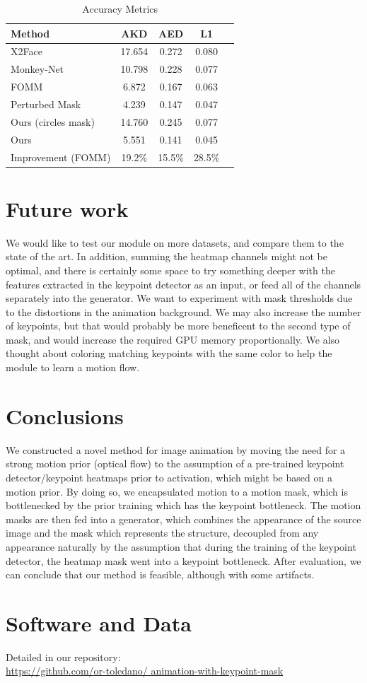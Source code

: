\documentclass{article}
\begin{document}
\begin{table}[t]
\caption{Accuracy Metrics}
\label{table:results}
\vskip 0.15in
\begin{center}
\begin{small}
\begin{sc}
\begin{tabular}{lcccr}
\toprule
Method & AKD & AED & L1 \\
\midrule
X2Face    & 17.654 & 0.272 & 0.080 \\
Monkey-Net    & 10.798 & 0.228 & 0.077 \\
FOMM    & 6.872 & 0.167 & 0.063 \\
Perturbed Mask & 4.239 & 0.147 & 0.047 \\
Ours (circles mask) & 14.760& 0.245 & 0.077 \\
Ours & 5.551 & 0.141 &  0.045\\
\midrule
Improvement (FOMM)    & 19.2\% & 15.5\% & 28.5\% \\
\bottomrule
\end{tabular}
\end{sc}
\end{small}
\end{center}
\vskip -0.1in
\end{table}
\section{Future work}
\label{future}
We would like to test our module on more datasets, and compare them to the
state of the art. In addition, summing the heatmap channels might not be
optimal, and there is certainly some space to try something deeper with the
features extracted in the keypoint detector as an input, or feed all of the
channels separately into the generator. We want to experiment with
mask thresholds due to the distortions in the animation background.
We may also increase the number of keypoints, but that would probably be
more beneficent to the second type of mask, and would increase the
required GPU memory proportionally. We also thought about coloring
matching keypoints with the same color to help the module to learn a motion
flow.

\section{Conclusions}
We constructed a novel method for image animation by moving the need for
a strong motion prior (optical flow) to the assumption of a pre-trained
keypoint detector/keypoint heatmaps prior to activation, which might be
based on a motion prior.
By doing so, we encapsulated motion to a motion mask, which is
bottlenecked by the prior training which has the keypoint bottleneck.
The motion masks are then fed into a generator, which combines the
appearance of the source image and the mask which represents the structure,
decoupled from any appearance naturally by the assumption that during the
training of the keypoint detector, the heatmap mask went into a keypoint
bottleneck. After evaluation, we can conclude that our method is
feasible, although with some artifacts.
\section*{Software and Data}
Detailed in our repository:
\\
\url{https://github.com/or-toledano/
animation-with-keypoint-mask}


\end{document}
